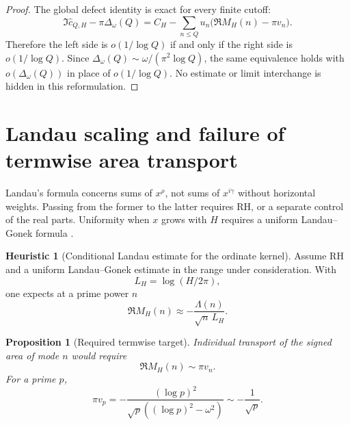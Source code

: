 \documentclass[11pt]{amsart}
\numberwithin{equation}{section}
\theoremstyle{plain}
\newtheorem{proposition}[theorem]{Proposition}
\theoremstyle{definition}
\newtheorem{heuristic}[theorem]{Heuristic}
\theoremstyle{remark}
\newcommand{\RH}{\mathrm{RH}}
\newcommand{\1}{\mathbf{1}}
\begin{document}
\begin{proof}
The global defect identity is exact for every finite cutoff:
\begin{equation}
\Im\widehat c_{Q,H}-\pi\Delta_\omega(Q)
=
C_H-
\sum_{n\leq Q}u_n\bigl(\Re M_H(n)-\pi v_n\bigr).
\label{eq:transport_equivalence_repeated}
\end{equation}
Therefore the left side is \(o(1/\log Q)\) if and only if the right side is
\(o(1/\log Q)\).  Since
\(\Delta_\omega(Q)\sim\omega/(\pi^2\log Q)\), the same equivalence holds
with \(o(\Delta_\omega(Q))\) in place of \(o(1/\log Q)\).  No estimate or
limit interchange is hidden in this reformulation.
\end{proof}

\section{Landau scaling and failure of termwise area transport}
\label{sec:landau_scaling}

Landau's formula concerns sums of \(x^\rho\), not sums of \(x^{i\gamma}\)
without horizontal weights.  Passing from the former to the latter requires
\(\RH\), or a separate control of the real parts.  Uniformity when \(x\)
grows with \(H\) requires a uniform Landau--Gonek formula
\cite{Gonek1985,FordZaharescu2005}.

\begin{heuristic}[Conditional Landau estimate for the ordinate kernel]
\label{heur:landau_kernel}
Assume \(\RH\) and a uniform Landau--Gonek estimate in the range under
consideration.  With
\begin{equation}
L_H=\log(H/2\pi),
\label{eq:LH_definition}
\end{equation}
one expects at a prime power \(n\)
\begin{equation}
\Re M_H(n)
\approx
-\frac{\Lambda(n)}{\sqrt n\,L_H}.
\label{eq:MH_landau_heuristic}
\end{equation}
\end{heuristic}

\begin{proposition}[Required termwise target]
\label{prop:termwise_target}
Individual transport of the signed area of mode \(n\) would require
\begin{equation}
\Re M_H(n)\sim\pi v_n.
\label{eq:termwise_target}
\end{equation}
For a prime \(p\),
\begin{equation}
\pi v_p
=
-\frac{(\log p)^2}
{\sqrt p((\log p)^2-\omega^2)}
\sim
-\frac1{\sqrt p}.
\label{eq:pi_vp_asymptotic}
\end{equation}
\end{proposition}
\end{document}
